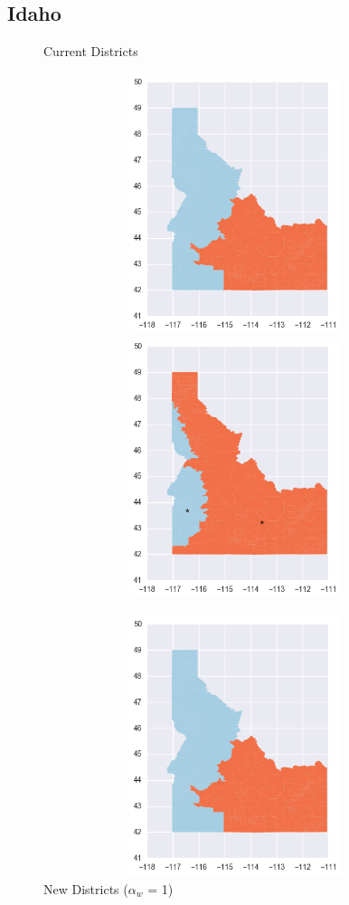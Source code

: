 \clearpage
\newpage

\subsection{Idaho}
\begin{figure}[htb!] \centering
\caption{ Current Districts }
\includegraphics[width=5in,height=3in,keepaspectratio]{../maps/ID/static/before.png}
\includegraphics[width=5in,height=3in,keepaspectratio]{../maps/ID/static/0_0_after.png}
\caption{ New Districts ($\alpha_w$ = 1) }
\includegraphics[width=5in,height=3in,keepaspectratio]{../maps/ID/static/before.png}

\end{figure}
